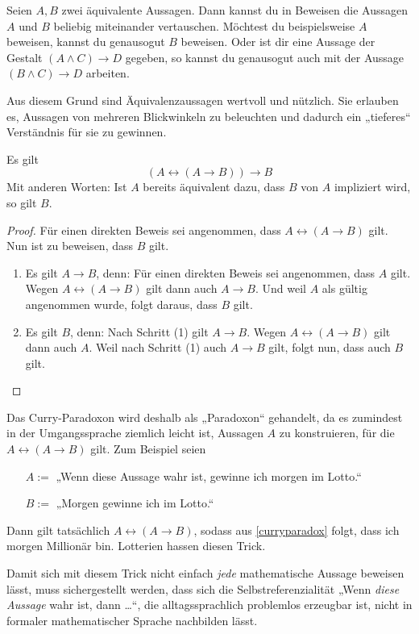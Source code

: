\begin{bem}[Substitutionsprinzip] 
    Seien $A,B$ zwei äquivalente Aussagen. Dann kannst du in Beweisen die Aussagen $A$ und $B$ beliebig miteinander vertauschen. Möchtest du beispielsweise $A$ beweisen, kannst du genausogut $B$ beweisen. Oder ist dir eine Aussage der Gestalt $(A\land C)\to D$ gegeben, so kannst du genausogut auch mit der Aussage $(B\land C)\to D$ arbeiten.
    
    Aus diesem Grund sind Äquivalenzaussagen wertvoll und nützlich. Sie erlauben es, Aussagen von mehreren Blickwinkeln zu beleuchten und dadurch ein „tieferes“ Verständnis für sie zu gewinnen.
\end{bem}


\begin{satz} \label{curryparadox}
    Es gilt
        \[ (A\leftrightarrow (A\to B))\to B \]
    Mit anderen Worten: Ist $A$ bereits äquivalent dazu, dass $B$ von $A$ impliziert wird, so gilt $B$.
\end{satz}
\begin{proof}
    Für einen direkten Beweis sei angenommen, dass $A\leftrightarrow (A\to B)$ gilt. Nun ist zu beweisen, dass $B$ gilt.
    \begin{enumerate}[(1)]
        \item Es gilt $A\to B$, denn: Für einen direkten Beweis sei angenommen, dass $A$ gilt. Wegen $A\leftrightarrow (A\to B)$ gilt dann auch $A\to B$. Und weil $A$ als gültig angenommen wurde, folgt daraus, dass $B$ gilt.
        \item Es gilt $B$, denn: Nach Schritt (1) gilt $A\to B$. Wegen $A\leftrightarrow (A\to B)$ gilt dann auch $A$. Weil nach Schritt (1) auch $A\to B$ gilt, folgt nun, dass auch $B$ gilt. \qedhere
    \end{enumerate}
\end{proof}


\begin{bem}
    Das Curry-Paradoxon wird deshalb als „Paradoxon“ gehandelt, da es zumindest in der Umgangssprache ziemlich leicht ist, Aussagen $A$ zu konstruieren, für die $A\leftrightarrow (A\to B)$ gilt. Zum Beispiel seien
    \begin{itemize}[labelindent=1.5em, leftmargin=!, labelwidth=]
        \item[$A:=$] „Wenn diese Aussage wahr ist, gewinne ich morgen im Lotto.“
        \item[$B:=$] „Morgen gewinne ich im Lotto.“
    \end{itemize}
    Dann gilt tatsächlich $A\leftrightarrow (A\to B)$, sodass aus \cref{curryparadox} folgt, dass ich morgen Millionär bin. Lotterien hassen diesen Trick.
    
    Damit sich mit diesem Trick nicht einfach \emph{jede} mathematische Aussage beweisen lässt, muss sichergestellt werden, dass sich die Selbstreferenzialität „Wenn \emph{diese Aussage} wahr ist, dann \dots“, die alltagssprachlich problemlos erzeugbar ist, nicht in formaler mathematischer Sprache nachbilden lässt.
\end{bem}





